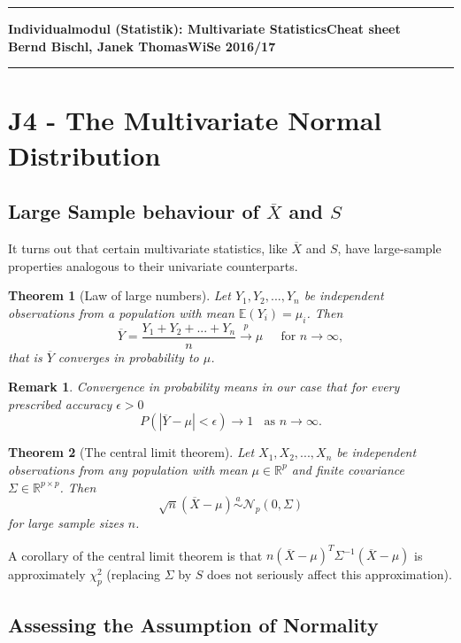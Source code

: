 \documentclass[a4paper]{article}
\newcommand{\kopf}[1] {
\hrule
\vspace{.15cm}
\begin{minipage}{\textwidth}
	{\sf\bf Individualmodul (Statistik): Multivariate Statistics\hfill Cheat sheet\\
	 Bernd Bischl, Janek Thomas\hfill WiSe 2016/17}
\end{minipage}
\vspace{.05cm}
\hrule
\vspace{1cm}}
\newtheorem*{remark}{Remark}
\newtheorem*{theorem}{Theorem}
\begin{document}
\kopf{1}

\section*{J4 - The Multivariate Normal Distribution}

\subsection*{Large Sample behaviour of $\overline{X}$ and $S$}

It turns out that certain multivariate statistics, like $\overline{X}$ and $S$, have large-sample properties analogous to their univariate counterparts. 

\begin{theorem}[Law of large numbers] 
Let $Y_1, Y_2, ..., Y_n$ be independent observations from a population with mean $\mathbb{E}(Y_i)=\mu_i$. Then
$$ \overline{Y}=\frac{Y_1+Y_2+...+Y_n}{n} \overset{p}{\longrightarrow}\mu ~~~~~ \text{ for }n \to \infty, $$
that is $\overline{Y}$ converges in probability to $\mu$.
\end{theorem}
\vspace{0.2cm}
\begin{remark}
Convergence in probability means in our case that for every prescribed accuracy $\epsilon>0$ $$P(|\overline{Y}-\mu| < \epsilon)\longrightarrow 1 ~~~~ \text{as } n\to\infty.$$
\end{remark}
\vspace{0.5cm}

\vspace{0.5cm}
\begin{theorem}[The central limit theorem]
Let $X_1, X_2, ..., X_n$ be independent observations from any population with mean $\mu \in \mathbb{R}^p$ and finite covariance $\Sigma \in \mathbb{R}^{p\times p}$. Then $$\sqrt{n}(\overline{X}-\mu) \overset{a}{\sim}\mathcal{N}_p(0, \Sigma)$$
for large sample sizes $n$. 
\end{theorem}

A corollary of the central limit theorem is that $n(\overline{X}-\mu)^T\Sigma^{-1} (\overline{X}-\mu)$ is approximately $\chi_p^2$ (replacing $\Sigma$ by $S$ does not seriously affect this approximation).


\subsection*{Assessing the Assumption of Normality}
\end{document}
